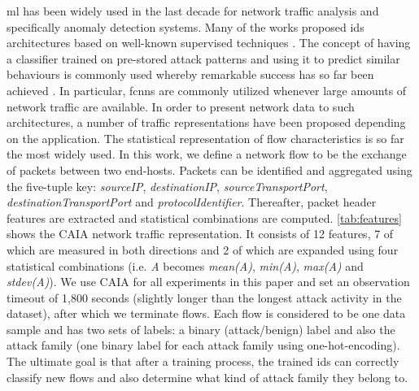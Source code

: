 \documentclass[conference]{IEEEtran}
\newcommand{\mynote}[3]{
    \fbox{\bfseries\sffamily\scriptsize#1}
    {\small$\blacktriangleright$\textsf{\emph{\color{#3}{#2}}}$\blacktriangleleft$}}
\newcommand{\todo}[1]{\mynote{TODO}{#1}{red}}
\begin{document}

\gls{ml} has been widely used in the last decade for network traffic analysis and specifically anomaly detection systems. Many of the works proposed \gls{ids} architectures based on well-known supervised techniques \cite{buczak_survey_2016,berman_survey_2019}. The concept of having a classifier trained on pre-stored attack patterns and using it to predict similar behaviours is commonly used whereby remarkable success has so far been achieved \cite{vigneswaran_evaluating_2018,ferrag_deep_2020,almseidin_evaluation_2017}. In particular, \glspl{fcnn} are commonly utilized whenever large amounts of network traffic are available. In order to present network data to such architectures, a number of traffic representations have been proposed depending on the application. The statistical representation of flow characteristics is so far the most widely used. In this work, we define a network flow to be the exchange of packets between two end-hosts. Packets can be identified and aggregated using the five-tuple key: \emph{sourceIP}, \emph{destinationIP}, \emph{sourceTransportPort}, \emph{destinationTransportPort} and \emph{protocolIdentifier}. Thereafter, packet header features are extracted and statistical combinations are computed. \autoref{tab:features} shows the CAIA \cite{williams_preliminary_2006} network traffic representation. It consists of 12 features, 7 of which are measured in both directions and 2 of which are expanded using four statistical combinations (i.e. \emph{A} becomes \emph{mean(A)}, \emph{min(A)}, \emph{max(A)} and \emph{stdev(A)}). We use CAIA for all experiments in this paper and set an observation timeout of 1,800 seconds (slightly longer than the longest attack activity in the dataset), after which we terminate flows. Each flow is considered to be one data sample and has two sets of labels: a binary (attack/benign) label and also the attack family (one binary label for each attack family using one-hot-encoding). The ultimate goal is that after a training process, the trained \gls{ids} can correctly classify new flows and also determine what kind of attack family they belong to.
\end{document}
